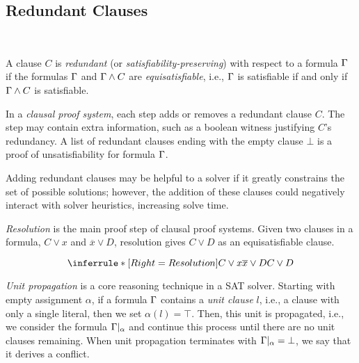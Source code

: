 \subsection{Redundant Clauses}~\label{subsec:redundant}

A clause $C$ is \emph{redundant} (or \emph{satisfiability-preserving}) with
respect to a formula $\Gamma$ if the formulas $\Gamma$ and $\Gamma \land C$ are
\emph{equisatisfiable}, i.e., $\Gamma$ is satisfiable if and only if $\Gamma \land C$
is satisfiable.

In a \emph{clausal proof system}, each step adds or removes a redundant
clause $C$. The step may contain extra information, such as a boolean witness
justifying $C$'s redundancy. A list of redundant clauses ending with the
empty clause $\bot$ is a proof of unsatisfiability for formula $\Gamma$.


Adding redundant clauses may be helpful to a solver if it greatly
constrains the set of possible solutions; however, the addition of these clauses
could negatively interact with solver heuristics, increasing solve time.


\emph{Resolution} is the main proof step of clausal proof systems. Given two clauses in a formula, $C \lor x$ and $\overline{x} \lor D$, resolution gives $C \lor D$ as an equisatisfiable clause.

\begin{equation*}
    \inferrule*[Right=Resolution]{
        C \lor x \\ \overline{x} \lor D
    }{
        C \lor D
    }    
\end{equation*}

\emph{Unit propagation} is a core reasoning technique in a SAT solver. Starting with empty assignment $\alpha$, if a formula $\Gamma$ contains a \emph{unit clause} $l$, i.e., a clause with only a single literal, then we set $\alpha(l) = \top$. Then, this unit is propagated, i.e., we consider the formula $\Gamma|_\alpha$ and continue this process until there are no unit clauses remaining. When unit propagation terminates with $\Gamma|_\alpha = \bot$, we say that it derives a conflict.

